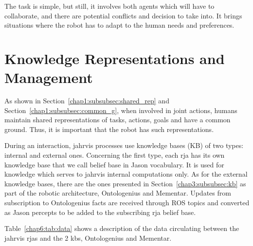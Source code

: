 \documentclass[a4paper,11pt,twoside]{StyleThese}
\begin{document}
The task is simple, but still, it involves both agents which will have to collaborate, and there are potential conflicts and decision to take into. It brings situations where the robot has to adapt to the human needs and preferences.

\section{Knowledge Representations and Management}\label{chap6:sec:know}
As shown in Section~\ref{chap1:subsubsec:shared_rep} and Section~\ref{chap1:subsubsec:common_g}, when involved in joint actions, humans maintain shared representations of tasks, actions, goals and have a common ground. Thus, it is important that the robot has such representations.

During an interaction, \acrshort{jahrvis} processes use knowledge bases (KB) of two types: internal and external ones. Concerning the first type, each \acrshort{rja} has its own knowledge base that we call belief base in Jason vocabulary. It is used for knowledge which serves to \acrshort{jahrvis} internal computations only. As for the external knowledge bases, there are the ones presented in Section~\ref{chap3:subsubsec:kb} as part of the robotic architecture, Ontologenius and Mementar. Updates from subscription to Ontologenius facts are received through ROS topics and converted as Jason percepts to be added to the subscribing \acrshort{rja} belief base. 

Table~\ref{chap6:tab:data} shows a description of the data circulating between the \acrshort{jahrvis} \acrshort{rja}s and the 2 \acrlong{kb}s, Ontologenius and Mementar.
\end{document}
